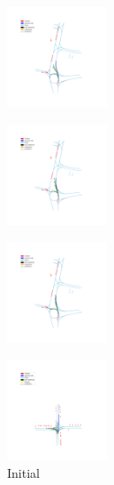 \begin{figure}
    \centering
    \begin{subfigure}[t]{0.3\linewidth}
        \includegraphics[height=3cm,trim={280 160 300 370},clip]{images_results/56d0094604014dee90a4dfb6f861f4e6_80e84ccf181a428e939af2fbde7d4211_0-min.png}
    \end{subfigure}
    \begin{subfigure}[t]{0.3\linewidth}
        \includegraphics[height=3cm,trim={280 160 300 370},clip]{images_results/56d0094604014dee90a4dfb6f861f4e6_80e84ccf181a428e939af2fbde7d4211_1-min.png}
    \end{subfigure}
    \begin{subfigure}[t]{0.3\linewidth}
        \includegraphics[height=3cm,trim={280 160 300 370},clip]{images_results/56d0094604014dee90a4dfb6f861f4e6_80e84ccf181a428e939af2fbde7d4211_2-min.png}
    \end{subfigure}
    \begin{subfigure}[t]{0.3\linewidth}
        \includegraphics[height=3cm,trim={280 170 300 380},clip]{images_results/1337_minADE5_9.3_0-min.png}
        \caption{Initial}
    \end{subfigure}
    \begin{subfigure}[t]{0.3\linewidth}

\end{subfigure}
\end{figure}
